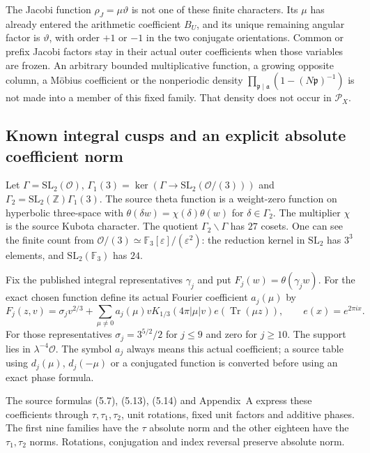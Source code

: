 The Jacobi function \(\rho_J=\mu\vartheta\) is not one of these
finite characters. Its \(\mu\) has already entered the arithmetic
coefficient \(B_U\), and its unique remaining angular factor is
\(\vartheta\), with order \(+1\) or \(-1\) in the two conjugate
orientations. Common or prefix Jacobi factors stay in their actual
outer coefficients when those variables are frozen.
An arbitrary bounded multiplicative function, a growing opposite
column, a M\"obius coefficient or the nonperiodic density
\(\prod_{\mathfrak p\mid\mathfrak a}(1-(N\mathfrak p)^{-1})\)
is not made into a member of this fixed family. That density does
not occur in \(\mathcal P_X\).

\subsection{Known integral cusps and an explicit absolute coefficient norm}
\label{rg:cusp-norm-proof}
Let
\(\Gamma=\mathrm{SL}_2(\mathcal O)\),
\(\Gamma_1(3)=\ker(\Gamma\to\mathrm{SL}_2(\mathcal O/(3)))\)
and
\(\Gamma_2=\mathrm{SL}_2(\mathbb Z)\Gamma_1(3)\).
The source theta function is a weight-zero function on hyperbolic
three-space with
\(\theta(\delta w)=\chi(\delta)\theta(w)\) for
\(\delta\in\Gamma_2\).
The multiplier \(\chi\) is the source Kubota character.
The quotient \(\Gamma_2\backslash\Gamma\) has \(27\) cosets.
One can see the finite count from
\(\mathcal O/(3)\simeq\mathbb F_3[\varepsilon]/(\varepsilon^2)\):
the reduction kernel in \(\mathrm{SL}_2\) has
\(3^3\) elements, and \(\mathrm{SL}_2(\mathbb F_3)\) has \(24\).

Fix the published integral representatives \(\gamma_j\) and put
\(F_j(w)=\theta(\gamma_jw)\).
For the exact chosen function define its actual Fourier coefficient
\(a_j(\mu)\) by
\begin{equation}\label{rg:cusp-expansion}
 F_j(z,v)=\sigma_jv^{2/3}
  +\sum_{\mu\ne0}a_j(\mu)vK_{1/3}(4\pi|\mu|v)
                                        e(\operatorname{Tr}(\mu z)),
 \qquad e(x)=e^{2\pi ix}.
\end{equation}
For those representatives
\(\sigma_j=3^{5/2}/2\) for \(j\le9\) and zero for \(j\ge10\).
The support lies in \(\lambda^{-4}\mathcal O\).
The symbol \(a_j\) always means this actual coefficient;
a source table using \(d_j(\mu)\), \(d_j(-\mu)\) or a conjugated
function is converted before using an exact phase formula.

The source formulas (5.7), (5.13), (5.14) and Appendix~A express
these coefficients through \(\tau,\tau_1,\tau_2\), unit rotations,
fixed unit factors and additive phases.
The first nine families have the \(\tau\) absolute norm and the
other eighteen have the \(\tau_1,\tau_2\) norms.
Rotations, conjugation and index reversal preserve absolute norm.

